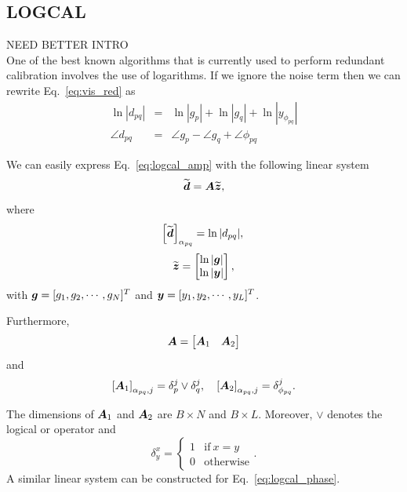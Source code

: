 \documentclass[useAMS,usenatbib]{mn2e}
\newcommand{\bz}{\bmath{z}}
\newcommand{\bA}{\bmath{A}}
\newcommand{\bg}{\bmath{g}}
\newcommand{\bd}{\bmath{d}}
\newcommand{\by}{\bmath{y}}
\begin{document}
\subsection{LOGCAL}
NEED BETTER INTRO\\
One of the best known algorithms that is currently used to perform redundant calibration involves the use of logarithms. If we ignore the noise term then we can 
rewrite Eq.~\eqref{eq:vis_red} as
\begin{eqnarray}
\ln |d_{pq}| &=& \ln |g_p| + \ln |g_q| + \ln |y_{\phi_{pq}}| \label{eq:logcal_amp}\\
\angle d_{pq} &=& \angle g_p - \angle g_q + \angle \phi_{pq} \label{eq:logcal_phase}
\end{eqnarray}

We can easily express Eq.~\eqref{eq:logcal_amp} with the following linear system
\begin{equation}
\widetilde{\bd} = \bA\widetilde{\bz}, 
\end{equation}
where
\begin{equation}
\left [ \widetilde{\bd}\right ]_{\alpha_{pq}} = \ln |d_{pq}|,\nonumber\\ 
\end{equation}
\begin{equation}
\widetilde{\bz} = \begin{bmatrix}
                  \ln | \bg |\\
                  \ln | \by |
                  \end{bmatrix},
\end{equation}
with $\bg = [g_1,g_2,\cdots,g_N]^T$ and $\by = [y_1,y_2,\cdots,y_L]^T$.

Furthermore,
\begin{equation}
\label{eq:A}
\bA = \begin{bmatrix}
       \bA_1 & \bA_2
      \end{bmatrix}
\end{equation}
and
\begin{equation}
\left [ \bA_1 \right ]_{\alpha_{pq},j} = \delta^j_p\vee\delta^j_q,  ~~~ \left [ \bA_2 \right ]_{\alpha_{pq},j} = \delta_{\phi_{pq}}^j. 
\end{equation}

The dimensions of $\bA_1$ and $\bA_2$ are $B\times N$ and $B\times L$.
Moreover, $\vee$ denotes the logical or operator and
\begin{equation}
\delta_y^x  = \begin{cases}
          1 & \textrm{if}~x=y\\
          0 & \textrm{otherwise}
         \end{cases}.
\end{equation}
A similar linear system can be constructed for Eq.~\eqref{eq:logcal_phase}.\\
\end{document}
